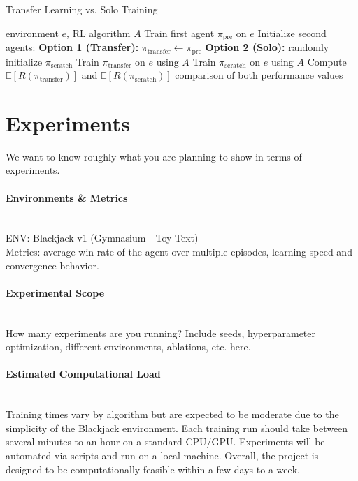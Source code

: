 \documentclass{article}
\begin{document}
\begin{algorithm}[H]
    \caption{Transfer Learning vs. Solo Training}
    \label{alg:transfer}
    \begin{algorithmic}
        \Require environment $e$, RL algorithm $A$
        \State Train first agent $\pi_{\text{pre}}$ on $e$
        \State Initialize second agents:
        \Statex \quad \textbf{Option 1 (Transfer):} $\pi_{\text{transfer}} \leftarrow \pi_{\text{pre}}$
        \Statex \quad \textbf{Option 2 (Solo):} randomly initialize $\pi_{\text{scratch}}$
            \State Train $\pi_{\text{transfer}}$ on $e$ using $A$
            \State Train $\pi_{\text{scratch}}$ on $e$ using $A$
        \EndWhile
        \State Compute $\mathbb{E}[R(\pi_{\text{transfer}})]$ and $\mathbb{E}[R(\pi_{\text{scratch}})]$
        \State \Return comparison of both performance values
    \end{algorithmic}
\end{algorithm}

\section{Experiments}
We want to know roughly what you are planning to show in terms of experiments. 

\paragraph{Environments \& Metrics}
~\\
ENV: Blackjack-v1 (Gymnasium - Toy Text)\\
Metrics: average win rate of the agent over multiple episodes, learning speed and convergence behavior.

\paragraph{Experimental Scope}
~\\
How many experiments are you running? Include seeds, hyperparameter optimization, different environments, ablations, etc. here.

\paragraph{Estimated Computational Load}
~\\
Training times vary by algorithm but are expected to be moderate due to the simplicity of the Blackjack environment. Each training run should take between several minutes to an hour on a standard CPU/GPU. Experiments will be automated via scripts and run on a local machine. Overall, the project is designed to be computationally feasible within a few days to a week.
\end{document}

